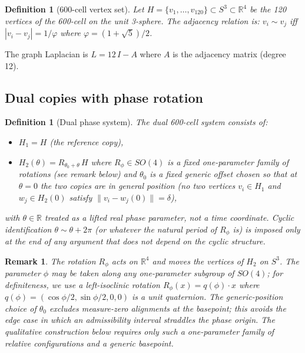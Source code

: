 \documentclass[12pt]{article}
\newtheorem{definition}[theorem]{Definition}
\newtheorem{remark}[theorem]{Remark}
\begin{document}
\begin{definition}[600-cell vertex set]\label{def:H}
Let $H = \{v_1, \ldots, v_{120}\} \subset S^3 \subset \mathbb{R}^4$ be the 120 vertices of the 600-cell on the unit 3-sphere. The adjacency relation is: $v_i \sim v_j$ iff $|v_i - v_j| = 1/\varphi$ where $\varphi = (1+\sqrt{5})/2$.
\end{definition}

The graph Laplacian is $L = 12\,I - A$ where $A$ is the adjacency matrix (degree 12).

\subsection{Dual copies with phase rotation}

\begin{definition}[Dual phase system]\label{def:dual}
The dual 600-cell system consists of:
\begin{itemize}
    \item $H_1 = H$ (the reference copy),
    \item $H_2(\theta) = R_{\theta_0 + \theta}\, H$ where $R_\phi \in SO(4)$ is a fixed one-parameter family of rotations (see remark below) and $\theta_0$ is a fixed generic offset chosen so that at $\theta = 0$ the two copies are in general position (no two vertices $v_i \in H_1$ and $w_j \in H_2(0)$ satisfy $\|v_i - w_j(0)\| = \delta$),
\end{itemize}
with $\theta \in \mathbb{R}$ treated as a lifted real phase parameter, not a time coordinate. Cyclic identification $\theta \sim \theta + 2\pi$ (or whatever the natural period of $R_\phi$ is) is imposed only at the end of any argument that does not depend on the cyclic structure.
\end{definition}

\begin{remark}
The rotation $R_\phi$ acts on $\mathbb{R}^4$ and moves the vertices of $H_2$ on $S^3$. The parameter $\phi$ may be taken along any one-parameter subgroup of $SO(4)$; for definiteness, we use a left-isoclinic rotation $R_\phi(x) = q(\phi) \cdot x$ where $q(\phi) = (\cos\phi/2, \sin\phi/2, 0, 0)$ is a unit quaternion. The generic-position choice of $\theta_0$ excludes measure-zero alignments at the basepoint; this avoids the edge case in which an admissibility interval straddles the phase origin. The qualitative construction below requires only such a one-parameter family of relative configurations and a generic basepoint.
\end{remark}
\end{document}
